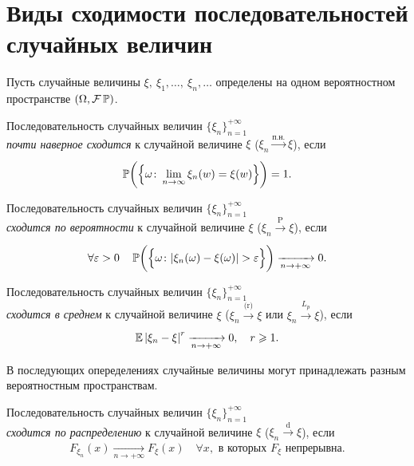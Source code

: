 \section{Виды сходимости последовательностей случайных величин}
Пусть случайные величины $\xi, \: \xi_1, \ldots, \: \xi_n, \ldots$ определены на одном вероятностном пространстве $\left(\Omega, \mathcal{F} \operatorname{\mathbb{P}}\right)$.

\begin{defn}
    Последовательность случайных величин $\{\xi_n\}_{n = 1}^{+\infty}$ \\ 
    \textit{почти наверное сходится} к случайной величине $\xi$ ($\xi_n \xrightarrow[]{\text{п.н.}} \xi$), если
    \begin{equation*}
        \operatorname{\mathbb{P}}\biggl(\left\{\omega \colon \lim\limits _{n \to \infty} \xi_{n}(w)=\xi(w)\right\}\biggr)=1.
    \end{equation*}
\end{defn}

\begin{defn}
    Последовательность случайных величин $\{\xi_n\}_{n = 1}^{+\infty}$ \\
    \textit{сходится по вероятности} к случайной величине $\xi$ ($\xi_n \xrightarrow[]{\text{P}} \xi$), если
    \begin{equation*}
        \forall \varepsilon>0 \quad \MyPr \biggl( \Bigl\{ \omega \colon |\xi_{n}(\omega)-\xi(\omega)|>\varepsilon \Bigr\} \biggr) \xrightarrow[n \to +\infty]{} 0.
    \end{equation*}
\end{defn}

\begin{defn}
    Последовательность случайных величин $\{\xi_n\}_{n=1}^{+\infty}$ \\
    \textit{сходится в среднем} к случайной величине $\xi$ ($\xi_n \xrightarrow[]{\text{(r)}} \xi$ или $\xi_n \xrightarrow[]{L_p} \xi$), если
    \begin{equation*}
        \operatorname{\mathbb{E}} \left|\xi_{n}-\xi\right|^{r} \xrightarrow[n \to +\infty]{} 0, \quad r \geqslant 1.
    \end{equation*}
\end{defn}

В последующих опеределениях случайные величины могут принадлежать разным вероятностным пространствам.
\begin{defn}
    Последовательность случайных величин $\{\xi_n\}_{n=1}^{+\infty}$ \\
    \textit{сходится по распределению} к случайной величине $\xi$ ($\xi_n \xrightarrow[]{\text{d}} \xi$), если
    \begin{equation*}
        F_{\xi_n}(x) \xrightarrow[n \to +\infty]{} F_{\xi}(x) \quad \forall x, \text{ в которых } F_{\xi} \text{ непрерывна}.
    \end{equation*}
\end{defn}

